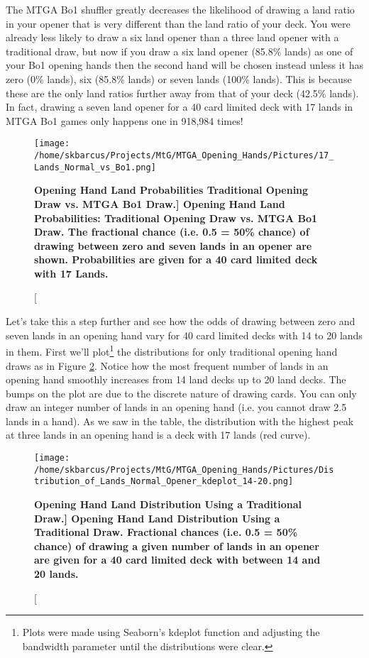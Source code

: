 \documentclass[oneside]{book}   %
\begin{document}
The MTGA Bo1 shuffler greatly decreases the likelihood of drawing a land ratio in your opener that is very different than the land ratio of your deck. You were already less likely to draw a six land opener than a three land opener with a traditional draw, but now if you draw a six land opener (85.8\% lands) as one of your Bo1 opening hands then the second hand will be chosen instead unless it has zero (0\% lands), six (85.8\% lands) or seven lands (100\% lands). This is because these are the only land ratios further away from that of your deck (42.5\% lands). In fact, drawing a seven land opener for a 40 card limited deck with 17 lands in MTGA Bo1 games only happens one in 918,984 times!\\

 	\begin{figure}[!ht]
	\centering
	\centerline{\texttt{[image: /home/skbarcus/Projects/MtG/MTGA\_Opening\_Hands/Pictures/17\_Lands\_Normal\_vs\_Bo1.png]}}
	\caption[\bf{Opening Hand Land Probabilities Traditional Opening Draw vs. MTGA Bo1 Draw.}]{
	{\bf{Opening Hand Land Probabilities: Traditional Opening Draw vs. MTGA Bo1 Draw.}} The fractional chance (i.e. 0.5 = 50\% chance) of drawing between zero and seven lands in an opener are shown. Probabilities are given for a 40 card limited deck with 17 Lands.}
	\label{fig:traditional_vs_bo1_17}
	\end{figure}	
	
Let's take this a step further and see how the odds of drawing between zero and seven lands in an opening hand vary for 40 card limited decks with 14 to 20 lands in them. First we'll plot\footnote{Plots were made using Seaborn's kdeplot function and adjusting the bandwidth parameter until the distributions were clear.} the distributions for only traditional opening hand draws as in Figure \ref{fig:traditional_distributions}. Notice how the most frequent number of lands in an opening hand smoothly increases from 14 land decks up to 20 land decks. The bumps on the plot are due to the discrete nature of drawing cards. You can only draw an integer number of lands in an opening hand (i.e. you cannot draw 2.5 lands in a hand). As we saw in the table, the distribution with the highest peak at three lands in an opening hand is a deck with 17 lands (red curve).\\

 	\begin{figure}[!ht]
	\centering
	\centerline{\texttt{[image: /home/skbarcus/Projects/MtG/MTGA\_Opening\_Hands/Pictures/Distribution\_of\_Lands\_Normal\_Opener\_kdeplot\_14-20.png]}}
	\caption[\bf{Opening Hand Land Distribution Using a Traditional Draw.}]{
	{\bf{Opening Hand Land Distribution Using a Traditional Draw.}} Fractional chances (i.e. 0.5 = 50\% chance) of drawing a given number of lands in an opener are given for a 40 card limited deck with between 14 and 20 lands.}
	\label{fig:traditional_distributions}
	\end{figure}	
\end{document}
